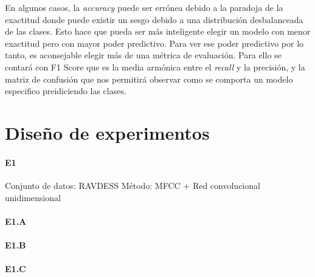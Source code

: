 \documentclass[11pt,a4paper,spanish]{book}
\begin{document}
	En algunos casos, la \emph{accuracy} puede ser errónea debido a la paradoja de la exactitud donde puede existir un sesgo debido a una distribución desbalanceada de las clases. Esto hace que pueda ser más inteligente elegir un modelo con menor exactitud pero con mayor poder predictivo.
	Para ver ese poder predictivo por lo tanto, es aconsejable elegir más de una métrica de evaluación. Para ello se contará con F1 Score que es la media armónica entre el \emph{recall} y la precisión, y la matriz de confusión que nos permitirá observar como se comporta un modelo especifico preidiciendo las clases.
	
	
	\section{Diseño de experimentos}
	
		\paragraph{E1}  %
		Conjunto de datos: RAVDESS
		Método: MFCC + Red convolucional unidimensional 
		\paragraph{E1.A}  %
		\paragraph{E1.B}  %
		\paragraph{E1.C}  %
	
	
		
	
	
		\printbibliography
	
\end{document}
